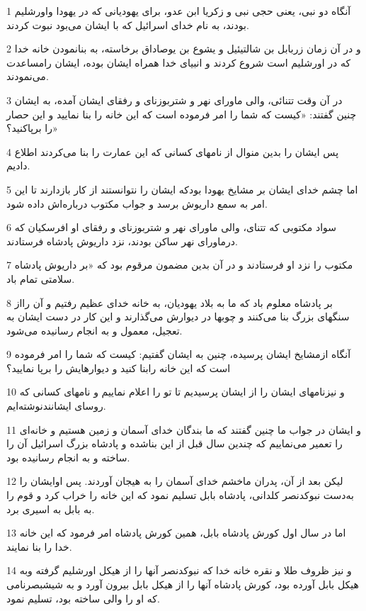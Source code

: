 \par 1 آنگاه دو نبی، یعنی حجی نبی و زکریا ابن عدو، برای یهودیانی که در یهودا واورشلیم بودند، به نام خدای اسرائیل که با ایشان می‌بود نبوت کردند.
\par 2 و در آن زمان زربابل بن شالتیئیل و یشوع بن یوصاداق برخاسته، به بنانمودن خانه خدا که در اورشلیم است شروع کردند و انبیای خدا همراه ایشان بوده، ایشان رامساعدت می‌نمودند.
\par 3 در آن وقت تتنائی، والی ماورای نهر و شتربوزنای و رفقای ایشان آمده، به ایشان چنین گفتند: «کیست که شما را امر فرموده است که این خانه را بنا نمایید و این حصار را برپاکنید؟»
\par 4 پس ایشان را بدین منوال از نامهای کسانی که این عمارت را بنا می‌کردند اطلاع دادیم.
\par 5 اما چشم خدای ایشان بر مشایخ یهودا بودکه ایشان را نتوانستند از کار بازدارند تا این امر به سمع داریوش برسد و جواب مکتوب درباره‌اش داده شود.
\par 6 سواد مکتوبی که تتنای، والی ماورای نهر و شتربوزنای و رفقای او افرسکیان که درماورای نهر ساکن بودند، نزد داریوش پادشاه فرستادند.
\par 7 مکتوب را نزد او فرستادند و در آن بدین مضمون مرقوم بود که «بر داریوش پادشاه سلامتی تمام باد.
\par 8 بر پادشاه معلوم باد که ما به بلاد یهودیان، به خانه خدای عظیم رفتیم و آن رااز سنگهای بزرگ بنا می‌کنند و چوبها در دیوارش می‌گذارند و این کار در دست ایشان به تعجیل، معمول و به انجام رسانیده می‌شود.
\par 9 آنگاه ازمشایخ ایشان پرسیده، چنین به ایشان گفتیم: کیست که شما را امر فرموده است که این خانه رابنا کنید و دیوارهایش را برپا نمایید؟
\par 10 و نیزنامهای ایشان را از ایشان پرسیدیم تا تو را اعلام نماییم و نامهای کسانی که روسای ایشانندنوشته‌ایم.
\par 11 و ایشان در جواب ما چنین گفتند که ما بندگان خدای آسمان و زمین هستیم و خانه‌ای را تعمیر می‌نماییم که چندین سال قبل از این بناشده و پادشاه بزرگ اسرائیل آن را ساخته و به انجام رسانیده بود.
\par 12 لیکن بعد از آن، پدران ماخشم خدای آسمان را به هیجان آوردند. پس اوایشان را به‌دست نبوکدنصر کلدانی، پادشاه بابل تسلیم نمود که این خانه را خراب کرد و قوم را به بابل به اسیری برد.
\par 13 اما در سال اول کورش پادشاه بابل، همین کورش پادشاه امر فرمود که این خانه خدا را بنا نمایند.
\par 14 و نیز ظروف طلا و نقره خانه خدا که نبوکدنصر آنها را از هیکل اورشلیم گرفته وبه هیکل بابل آورده بود، کورش پادشاه آنها را از هیکل بابل بیرون آورد و به شیشبصرنامی که او را والی ساخته بود، تسلیم نمود.
